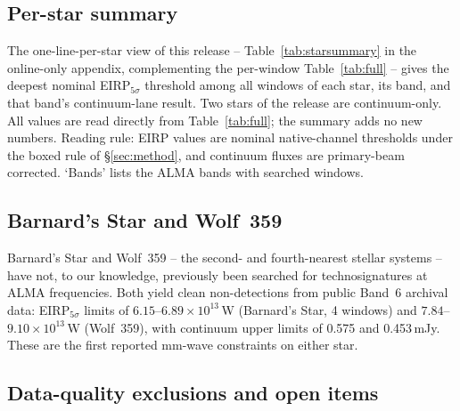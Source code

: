 \documentclass{openjournal}
\begin{document}
\subsection{Per-star summary}
\label{sec:starsummary}

The one-line-per-star view of this release -- Table~\ref{tab:starsummary}
in the online-only appendix, complementing the per-window
Table~\ref{tab:full} -- gives the deepest nominal EIRP$_{5\sigma}$
threshold among all windows of each star, its band, and that band's
continuum-lane result. Two stars of the release are
continuum-only. All values are read directly from
Table~\ref{tab:full}; the summary adds no new numbers. Reading rule:
EIRP values are nominal native-channel thresholds under the boxed rule
of \S\ref{sec:method}, and continuum fluxes are primary-beam
corrected. `Bands' lists the ALMA bands with searched windows.


\subsection{Barnard's Star and Wolf~359}
\label{sec:barnardswolf}

Barnard's Star and Wolf~359 -- the second- and fourth-nearest stellar
systems -- have not, to our knowledge, previously been searched for
technosignatures at ALMA frequencies. Both yield clean non-detections
from public Band~6 archival data: EIRP$_{5\sigma}$ limits of
$6.15$--$6.89\times10^{13}$\,W (Barnard's Star, 4 windows) and
$7.84$--$9.10\times10^{13}$\,W (Wolf~359), with continuum upper limits
of 0.575 and 0.453\,mJy. These are the first reported mm-wave
constraints on either star.

\subsection{Data-quality exclusions and open items}
\label{sec:exclusions}
\end{document}
